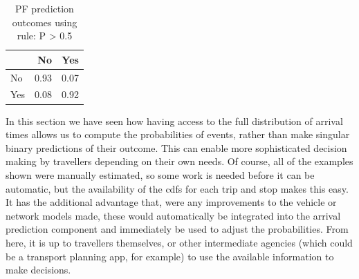 \begin{knitrout}
\color{fgcolor}\begin{table}

\caption{\label{tab:eta_journey_transfer_many2}PF prediction outcomes using rule: P > 0.5}
\centering
\begin{tabular}[t]{lrr}
\toprule
  & No & Yes\\
\midrule
No & 0.93 & 0.07\\
Yes & 0.08 & 0.92\\
\bottomrule
\end{tabular}
\end{table}


\end{knitrout}



In this section we have seen how having access to the full distribution of arrival times allows us to compute the probabilities of events, rather than make singular binary predictions of their outcome. This can enable more sophisticated decision making by travellers depending on their own needs. Of course, all of the examples shown were manually estimated, so some work is needed before it can be automatic, but the availability of the \glspl{cdf} for each trip and stop makes this easy. It has the additional advantage that, were any improvements to the vehicle or network models made, these would automatically be integrated into the arrival prediction component and immediately be used to adjust the probabilities. From here, it is up to travellers themselves, or other intermediate agencies (which could be a transport planning app, for example) to use the available information to make decisions.
